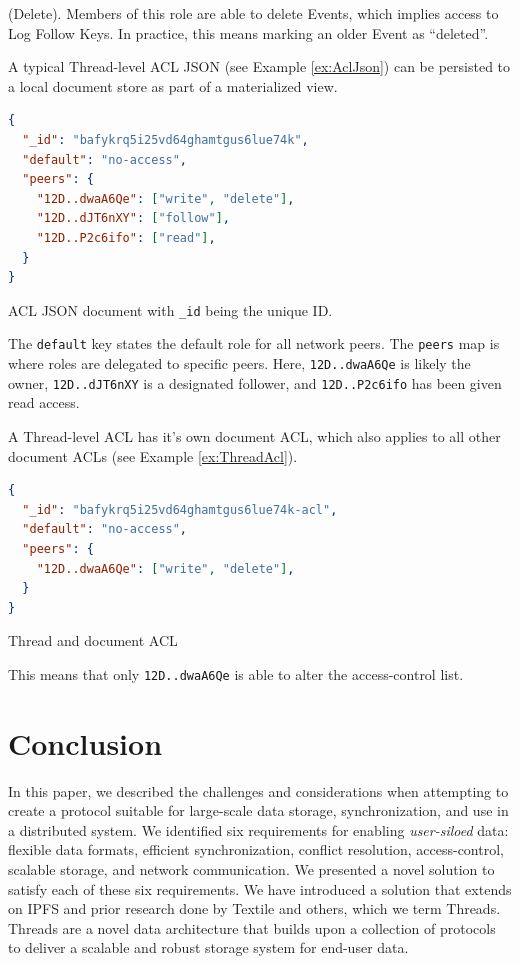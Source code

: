 \documentclass{textile}
\begin{document}
\begin{definition}
(Delete). Members of this role are able to delete Events, which implies access to Log Follow Keys. In practice, this means marking an older Event as ``deleted''.
\end{definition}

A typical Thread-level ACL JSON (see Example \ref{ex:AclJson}) can be persisted to a local document store as part of a materialized view.

\begin{example}
\begin{minipage}{.45\textwidth}
\begin{lstlisting}[language=json,firstnumber=1]
{
  "_id": "bafykrq5i25vd64ghamtgus6lue74k",
  "default": "no-access",
  "peers": {
    "12D..dwaA6Qe": ["write", "delete"],
    "12D..dJT6nXY": ["follow"],
    "12D..P2c6ifo": ["read"],
  }
}
\end{lstlisting}
\caption{ACL JSON document with \texttt{\_id} being the unique ID. }
 \label{ex:AclJson}
\end{minipage}
\end{example}

The \texttt{default} key states the default role for all network peers. The \texttt{peers} map is where roles are delegated to specific peers. Here, \texttt{12D..dwaA6Qe} is likely the owner, \texttt{12D..dJT6nXY} is a designated follower, and \texttt{12D..P2c6ifo} has been given read access.

 A Thread-level ACL has it's own document ACL, which also applies to all other document ACLs (see Example \ref{ex:ThreadAcl}).

\begin{example}
\begin{lstlisting}[language=json,firstnumber=1]
{
  "_id": "bafykrq5i25vd64ghamtgus6lue74k-acl",
  "default": "no-access",
  "peers": {
    "12D..dwaA6Qe": ["write", "delete"],
  }
}
\end{lstlisting}
\caption{Thread and document ACL}
\label{ex:ThreadAcl}
\end{example} 

This means that only \texttt{12D..dwaA6Qe} is able to alter the access-control list.

\section{Conclusion}

In this paper, we described the challenges and considerations when attempting to create a protocol suitable for large-scale data storage, synchronization, and use in a distributed system. We identified six requirements for enabling \emph{user-siloed} data: flexible data formats, efficient synchronization, conflict resolution, access-control, scalable storage, and network communication. We presented a novel solution to satisfy each of these six requirements. We have introduced a solution that extends on IPFS and prior research done by Textile and others, which we term Threads. Threads are a novel data architecture that builds upon a collection of protocols to deliver a scalable and robust storage system for end-user data. 
\end{document}
